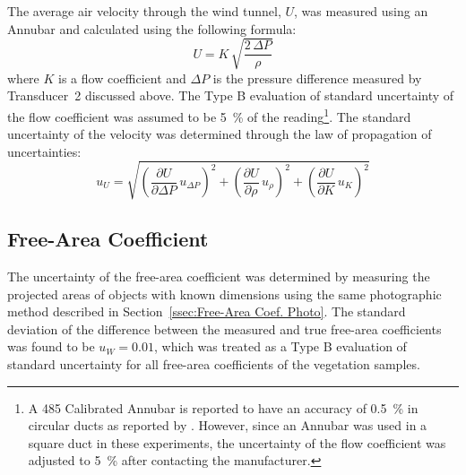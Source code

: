 \documentclass[12pt]{article}
\begin{document}
The average air velocity through the wind tunnel, $U$, was measured using an Annubar and calculated using the following formula:
\begin{equation}
\label{eq:Velocity}
U = K \, \sqrt{\frac{2 \, \Delta P}{\rho}}
\end{equation}
where $K$ is a flow coefficient and $\Delta P$ is the pressure difference measured by Transducer~2 discussed above. The Type B evaluation of standard uncertainty of the flow coefficient was assumed to be 5~\% of the reading\footnote{A 485 Calibrated Annubar is reported to have an accuracy of 0.5~\% in circular ducts as reported by \cite{Annubar}. However, since an Annubar was used in a square duct in these experiments, the uncertainty of the flow coefficient was adjusted to 5~\% after contacting the manufacturer.}. The standard uncertainty of the velocity was determined through the law of propagation of uncertainties:
\begin{equation}
\label{eq:Velocityuncertainty}
u_{\scriptscriptstyle U} = \sqrt{{\left( \frac{\partial U}{\partial \Delta P}\,u_{\scriptscriptstyle \Delta P} \right) }^2+{\left(\frac{\partial U}{\partial \rho}\,u_{\scriptscriptstyle \rho}\right)}^2+{\left(\frac{\partial U}{\partial K}\,u_{\scriptscriptstyle K}\right)}^2}
\end{equation}

\subsection{ Free-Area Coefficient }
\label{ssec:FAACUncertainty}

The uncertainty of the free-area coefficient was determined by measuring the projected areas of objects with known dimensions using the same photographic method described in Section~\ref{ssec:Free-Area Coef. Photo}. The standard deviation of the difference between the measured and true free-area coefficients was found to be $u_{\scriptscriptstyle W}=0.01$, which was treated as a Type B evaluation of standard uncertainty for all free-area coefficients of the vegetation samples.
\end{document}

